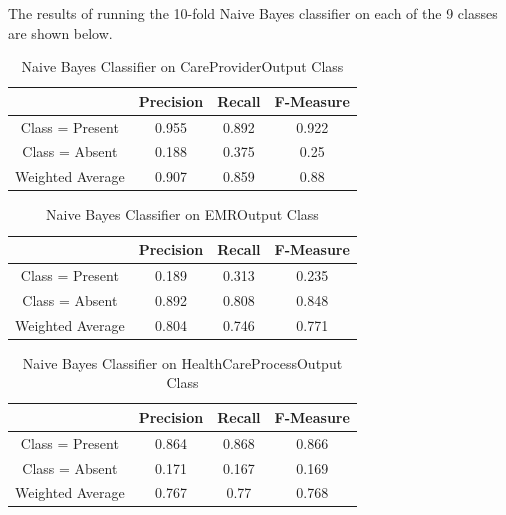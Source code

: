 \documentclass[11pt, notitlepage,abstracton,oneside]{article}   	%
\begin{document}
The results of running the 10-fold Naive Bayes classifier on each of the 9 classes are shown below.

\begin{table}[H]
    \caption{Naive Bayes Classifier on CareProviderOutput Class}
        \begin{center}
        \begin{tabular}{|c|c|c|c|}
            \hline
            & Precision & Recall & F-Measure \\ \hline
            Class = Present & 0.955 & 0.892 & 0.922 \\ \hline
            Class = Absent & 0.188 & 0.375 & 0.25 \\ \hline
            Weighted Average & 0.907 & 0.859 & 0.88 \\ \hline
        \end{tabular}
        \end{center}
    \label{default}
\end{table}%

\begin{table}[H]
    \caption{Naive Bayes Classifier on EMROutput Class}
        \begin{center}
        \begin{tabular}{|c|c|c|c|}
            \hline
            & Precision & Recall & F-Measure \\ \hline
            Class = Present & 0.189 & 0.313 & 0.235 \\ \hline
            Class = Absent & 0.892 & 0.808 & 0.848 \\ \hline
            Weighted Average & 0.804 & 0.746 & 0.771\\ \hline
        \end{tabular}
        \end{center}
    \label{default}
\end{table}%

\begin{table}[H]
    \caption{Naive Bayes Classifier on HealthCareProcessOutput Class}
        \begin{center}
        \begin{tabular}{|c|c|c|c|}
            \hline
            & Precision & Recall & F-Measure \\ \hline
            Class = Present & 0.864 & 0.868 & 0.866 \\ \hline
            Class = Absent & 0.171 & 0.167 & 0.169 \\ \hline
            Weighted Average & 0.767 & 0.77 & 0.768 \\ \hline
        \end{tabular}
        \end{center}
    \label{default}
\end{table}%
\end{document}
